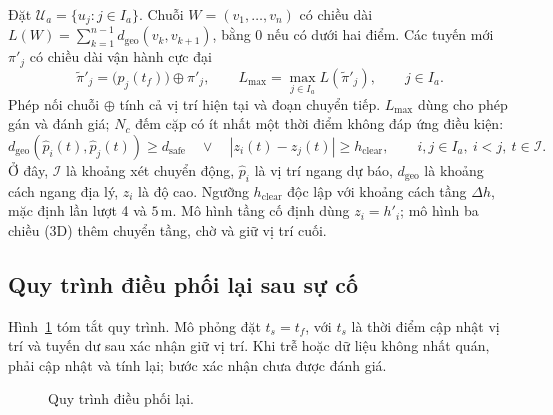 \documentclass[11pt,a4paper]{article}
\newcommand{\Ua}{\mathcal{U}_{a}}
\newcommand{\Lmax}{L_{\mathrm{max}}}
\newcommand{\dsaf}{d_{\mathrm{safe}}}
\newcommand{\Nc}{N_{c}}
\newcommand{\Dh}{\Delta h}
\begin{document}
Đặt $\Ua=\{u_j:j\in I_a\}$. Chuỗi $W=(v_1,\ldots,v_n)$ có chiều dài $L(W)=\sum_{k=1}^{n-1}d_{\mathrm{geo}}(v_k,v_{k+1})$, bằng 0 nếu có dưới hai điểm. Các tuyến mới $\pi'_j$ có chiều dài vận hành cực đại
\begin{equation}
 \widetilde\pi'_j=\bigl(p_j(t_f)\bigr)\oplus\pi'_j,\qquad
 \Lmax=\max_{j\in I_a}L(\widetilde\pi'_j),\qquad j\in I_a.
  \label{eq:operational-length}
\end{equation}
Phép nối chuỗi $\oplus$ tính cả vị trí hiện tại và đoạn chuyển tiếp. $\Lmax$ dùng cho phép gán và đánh giá; $\Nc$ đếm cặp có ít nhất một thời điểm không đáp ứng điều kiện:
\begin{equation}
  d_{\mathrm{geo}}\!\left(\hat{p}_{i}(t),\hat{p}_{j}(t)\right)\ge\dsaf
  \quad\lor\quad
  |z_i(t)-z_j(t)|\ge h_{\mathrm{clear}},
  \qquad i,j\in I_a,\ i<j,\ t\in\mathcal I.
\end{equation}
Ở đây, $\mathcal I$ là khoảng xét chuyển động, $\hat p_i$ là vị trí ngang dự báo, $d_{\mathrm{geo}}$ là khoảng cách ngang địa lý, $z_i$ là độ cao. Ngưỡng $h_{\mathrm{clear}}$ độc lập với khoảng cách tầng $\Dh$, mặc định lần lượt 4 và $5\,\mathrm{m}$. Mô hình tầng cố định dùng $z_i=h'_i$; mô hình ba chiều (3D) thêm chuyển tầng, chờ và giữ vị trí cuối.

\FloatBarrier
\subsection{Quy trình điều phối lại sau sự cố}

Hình~\ref{fig:pipeline} tóm tắt quy trình. Mô phỏng đặt $t_s=t_f$, với $t_s$ là thời điểm cập nhật vị trí và tuyến dư sau xác nhận giữ vị trí. Khi trễ hoặc dữ liệu không nhất quán, phải cập nhật và tính lại; bước xác nhận chưa được đánh giá.

\begin{figure}[H]
  \centering
  \caption{Quy trình điều phối lại.}
  \label{fig:pipeline}
\end{figure}
\end{document}
